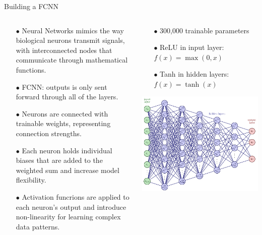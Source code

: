 \documentclass[aspectratio=169, 9pt]{beamer}
\begin{document}
\begin{frame}{Building a FCNN}
  \begin{columns}
    \begin{column}{0.5\textwidth}
      \begin{itemize}
        \item[$\bullet$] Neural Networks mimics the way biological neurons transmit signals, with interconnected nodes that communicate through mathematical functions.
        \item[$\bullet$] FCNN: outputs is only sent forward through all of the layers.
        \item[$\bullet$] Neurons are connected with trainable weights, representing connection strengths.
        \item[$\bullet$] Each neuron holds individual biases that are added to the weighted sum and increase model flexibility.
        \item[$\bullet$] Activation funcrions are applied to each neuron's output and introduce non-linearity for learning complex data patterns.
    \end{itemize}
    \end{column}
    \begin{column}{0.5\textwidth}
      \begin{itemize}
      \item[$\bullet$] 300,000 trainable parameters
      \item[$\bullet$] ReLU in input layer: $f(x) = \max(0, x)$
      \item[$\bullet$] Tanh in hidden layers: $f(x) = \tanh(x)$
      \end{itemize}
      \includegraphics[width=1.0\textwidth]{figures/FFNN_architecture.pdf}
    \end{column}
  \end{columns}
\end{frame}
\end{document}
